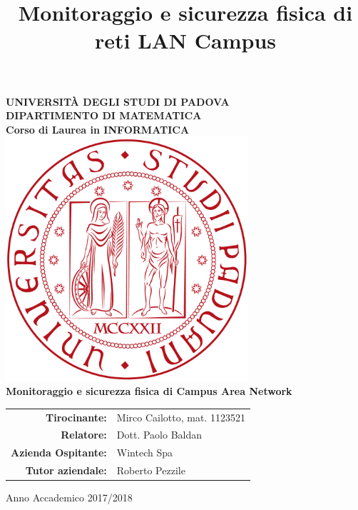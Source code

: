 \documentclass[openany, a4paper, 12pt]{report}
\title{Monitoraggio e sicurezza fisica di reti LAN Campus}
\begin{document}
\begin{titlepage}
	\centering
	\vfill
	{
		\bfseries
		\Large{UNIVERSITÀ DEGLI STUDI DI PADOVA}\\
		\large DIPARTIMENTO DI MATEMATICA\\
		\noindent\makebox[\linewidth]{\rule{16cm}{0.4pt}}
		Corso di Laurea in INFORMATICA
		\vskip1cm
		\includegraphics[width=9cm]{images/LogoPadova} \\
		\vfill
		\LARGE Monitoraggio e sicurezza fisica di Campus Area Network
		\vfill

		\begin{table}[htbp]
			\centering
			\renewcommand\arraystretch{1.2}
			\begin{tabular}{r|l}
				\textbf{Tirocinante:} & Mirco Cailotto, mat. 1123521 \\
				\textbf{Relatore:} & Dott. Paolo Baldan \\
				\textbf{Azienda Ospitante:}	& Wintech Spa \\
				\textbf{Tutor aziendale:} & Roberto Pezzile \\
			\end{tabular}
		\end{table}
		
		\vfill
		\noindent\makebox[\linewidth]{\rule{16cm}{0.4pt}}
		\large Anno Accademico 2017/2018
		\vfill
	}    
\end{titlepage}
\clearpage\thispagestyle{empty}\mbox{}\clearpage

\clearpage\thispagestyle{empty}\mbox{}\clearpage
{}
\tableofcontents
\listoffigures

\newpage
\clearpage\thispagestyle{empty}\mbox{}\clearpage
{}

\clearpage\thispagestyle{empty}\mbox{}\clearpage
{}





\clearpage\thispagestyle{empty}\mbox{}\clearpage

\renewcommand{\leftmark}{Appendici}


\renewcommand{\leftmark}{Glossario}
\printglossaries{}

\newpage


\renewcommand{\leftmark}{Bibliografia}
\end{document}
